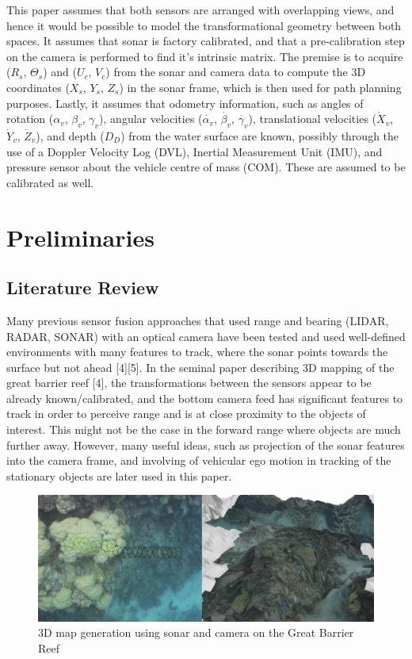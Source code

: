 \documentclass[a4paper]{IEEEtran}
\let\Theta\varTheta
\newcommand{\RSonar}{$\si{\textit{R}_{s}}$\xspace}
\newcommand{\ThetaSonar}{$\si{\Theta_{s}}$\xspace}
\newcommand{\UCamera}{$\si{\textit{U}_{c}}$\xspace}
\newcommand{\VCamera}{$\si{\textit{V}_{c}}$\xspace}
\newcommand{\XSonar}{$\si{\textit{X}_{s}}$\xspace}
\newcommand{\YSonar}{$\si{\textit{Y}_{s}}$\xspace}
\newcommand{\ZSonar}{$\si{\textit{Z}_{s}}$\xspace}
\newcommand{\Depth}{$D_{D}$\xspace}
\newcommand{\RollVehicle}{${\alpha_{v}}$\xspace}
\newcommand{\PitchVehicle}{${\beta_{v}}$\xspace}
\newcommand{\YawVehicle}{${\gamma_{v}}$\xspace}
\newcommand{\RollVehicleVelocity}{${\dot{\alpha_{v}}}$\xspace}
\newcommand{\PitchVehicleVelocity}{${\dot{\beta_{v}}}$\xspace}
\newcommand{\YawVehicleVelocity}{${\dot{\gamma_{v}}}$\xspace}
\newcommand{\XVehicleVelocity}{$\si{\dot{\textit{X}}_{v}}$\xspace}
\newcommand{\YVehicleVelocity}{$\si{\dot{\textit{Y}}_{v}}$\xspace}
\newcommand{\ZVehicleVelocity}{$\si{\dot{\textit{Z}}_{v}}$\xspace}
\begin{document}
This paper assumes that both sensors are arranged with overlapping views, and hence it would be possible to model the transformational geometry between both spaces. It assumes that sonar is factory calibrated, and that a pre-calibration step on the camera is performed to find it's intrinsic matrix. The premise is to acquire (\RSonar, \ThetaSonar) and (\UCamera, \VCamera) from the sonar and camera data to compute the 3D coordinates (\XSonar, \YSonar, \ZSonar) in the sonar frame, which is then used for path planning purposes. Lastly, it assumes that odometry information, such as angles of rotation (\RollVehicle, \PitchVehicle, \YawVehicle), angular velocities (\RollVehicleVelocity, \PitchVehicleVelocity, \YawVehicleVelocity), translational velocities (\XVehicleVelocity, \YVehicleVelocity, \ZVehicleVelocity), and depth (\Depth) from the water surface are known, possibly through the use of a Doppler Velocity Log (DVL), Inertial Measurement Unit (IMU), and pressure sensor about the vehicle centre of mass (COM). These are assumed to be calibrated as well. 

\section{Preliminaries}

\subsection{Literature Review}
Many previous sensor fusion approaches that used range and bearing (LIDAR, RADAR, SONAR) with an optical camera have been tested and used well-defined environments with many features to track, where the sonar points towards the surface but not ahead [4][5]. In the seminal paper describing 3D mapping of the great barrier reef [4], the transformations between the sensors appear to be already known/calibrated, and the bottom camera feed has significant features to track in order to perceive range and is at close proximity to the objects of interest. This might not be the case in the forward range where objects are much further away. However, many useful ideas, such as projection of the sonar features into the camera frame, and involving of vehicular ego motion in tracking of the stationary objects are later used in this paper.

\begin{figure}[h!]
  \centering
  \includegraphics[scale=0.5]{reef}
  \captionsetup{justification=centering}
  \caption{3D map generation using sonar and camera on the Great Barrier Reef}
\end{figure}
\end{document}
